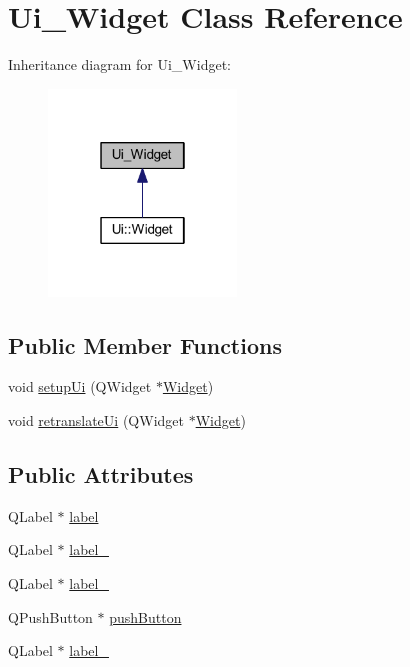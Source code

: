 \hypertarget{class_ui___widget}{}\section{Ui\+\_\+\+Widget Class Reference}
\label{class_ui___widget}


Inheritance diagram for Ui\+\_\+\+Widget\+:\nopagebreak
\begin{figure}[H]
\begin{center}
\leavevmode
\includegraphics[width=142pt]{class_ui___widget__inherit__graph}
\end{center}
\end{figure}
\subsection*{Public Member Functions}
\begin{DoxyCompactItemize}
\item 
void \hyperlink{class_ui___widget_a9039ed8704971418cbe19ef8c9eea266}{setup\+Ui} (Q\+Widget $\ast$\hyperlink{class_widget}{Widget})
\item 
void \hyperlink{class_ui___widget_ae1cb85db8d3658df8dcd104361edcecb}{retranslate\+Ui} (Q\+Widget $\ast$\hyperlink{class_widget}{Widget})
\end{DoxyCompactItemize}
\subsection*{Public Attributes}
\begin{DoxyCompactItemize}
\item 
Q\+Label $\ast$ \hyperlink{class_ui___widget_a3126b93450dcc18cede73b9d1ee7c6b0}{label}
\item 
Q\+Label $\ast$ \hyperlink{class_ui___widget_a6f06b143349464b5b19ac0ffe2fc084d}{label\+\_}
\item 
Q\+Label $\ast$ \hyperlink{class_ui___widget_adfcab5569ac08da197e14dba01390755}{label\+\_}
\item 
Q\+Push\+Button $\ast$ \hyperlink{class_ui___widget_a7dcf5da8902069415662905e93b0d5cb}{push\+Button}
\item 
Q\+Label $\ast$ \hyperlink{class_ui___widget_a7d22bf9c5cf51754b1c145db5ca0da79}{label\+\_}
\end{DoxyCompactItemize}


